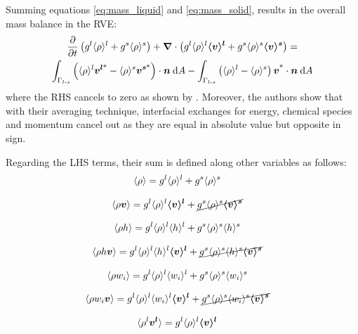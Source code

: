 Summing equations \eqref{eq:mass_liquid} and \eqref{eq:mass_solid}, results in the overall mass balance
in the RVE:
\begin{multline}
\label{eq:conservation_mass_local}
 \temp{\gl \rhol + \gs \rhos}  +  \nabvec \cdot \brac{\gl \rhol \vl + \gs \rhos \vs} = \\  
	  \integral{\Gamma_{\liqsol}}{\brac{\rhol \vlstar-\rhos \vsstar} \cdot \vec{n}}{A}
   -  \integral{\Gamma_{\liqsol}}{\brac{\rhol-\rhos} \vstar \cdot \vec{n}}{A}
\end{multline}
where the RHS cancels to zero as shown by \citet{ni_volume-averaged_1991}. Moreover, the authors show that with their averaging technique, 
interfacial exchanges for energy, chemical species and momentum cancel out as they are equal in absolute value but opposite in sign. 

Regarding the LHS terms, their sum is defined along other variables as follows:
\begin{align}
\label{eq:mainingredients1}
& \avg{\rho} = \gl \rhol + \gs \rhos
\end{align}

\begin{align}
\label{eq:mainingredients2}
& \avg{\rho \vec{v}} = \gl \rhol \vl + \cancel{\gs \rhos \vs}
\end{align}

\begin{align}
\label{eq:mainingredients3}
& \avg{\rho h} = \gl \rhol \hl + \gs \rhos \hs
\end{align}

\begin{align}
\label{eq:mainingredients4}
& \avg{\rho h \vec{v}} = \gl \rhol \hl \vl + \cancel{\gs \rhos \hs \vs}
\end{align}

\begin{align}
\label{eq:mainingredients5}
& \avg{\rho w_i} = \gl \rhol \wil + \gs \rhos \wis
\end{align}

\begin{align}
\label{eq:mainingredients6}
& \avg{\rho w_i \vec{v}} = \gl \rhol \wil \vl + \cancel{\gs \rhos \wis \vs}
\end{align}

\begin{align}
\label{eq:mainingredients7}
& \avg{\rho^l \vec{v^l}} = \gl \rhol \vl
\end{align}


